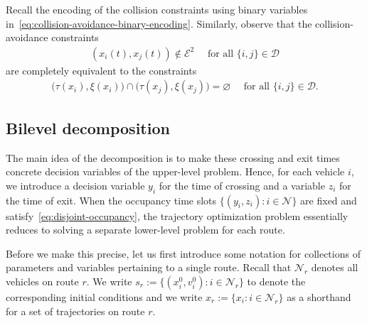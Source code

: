 \documentclass[a4paper]{report}
\theoremstyle{definition}
\theoremstyle{plain}
\begin{document}
Recall the encoding of the collision constraints using binary variables
in~\eqref{eq:collision-avoidance-binary-encoding}.
%
Similarly, observe that the collision-avoidance constraints
\begin{align*}
  (x_{i}(t), x_{j}(t)) \notin \mathcal{E}^{2} \quad \text{ for all } \{i,j\} \in \mathcal{D}
\end{align*}
are completely equivalent to the constraints
\begin{align}\label{eq:disjoint-occupancy}
  \big(\tau(x_{i}), \xi(x_{i}) \big) \cap \big(\tau(x_{j}), \xi(x_{j})\big) = \varnothing \quad \text{ for all } \{i,j\} \in \mathcal{D} .
\end{align}

\subsection{Bilevel decomposition}\label{sec:bilevel}
The main idea of the decomposition is to make these crossing and exit times
concrete decision variables of the upper-level problem.
%
Hence, for each vehicle $i$, we introduce a decision variable $y_{i}$ for the
time of crossing and a variable $z_{i}$ for the time of exit.
%
When the occupancy time slots $\{(y_{i}, z_{i}) : i \in \mathcal{N}\}$ are fixed
and satisfy~\eqref{eq:disjoint-occupancy}, the trajectory optimization problem
essentially reduces to solving a separate lower-level problem for each route.

Before we make this precise, let us first introduce some notation for
collections of parameters and variables pertaining to a single route.
%
Recall that $\mathcal{N}_{r}$ denotes all vehicles on route $r$.
We write $s_{r} := \{(x_{i}^{0}, v_{i}^{0}) : i \in \mathcal{N}_{r} \}$ to
denote the corresponding initial conditions and we write
$x_{r} := \{x_{i} : i \in \mathcal{N}_{r} \}$ as a shorthand for a set of
trajectories on route $r$.
\end{document}
